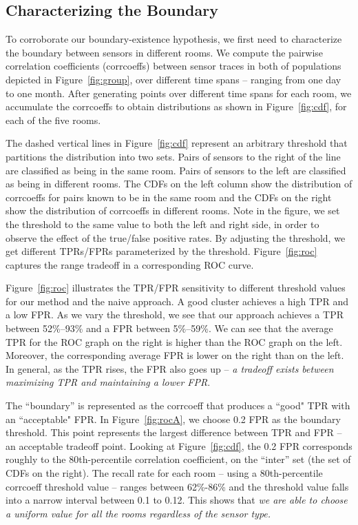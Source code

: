 \subsection{Characterizing the Boundary}
To corroborate our boundary-existence hypothesis, we first need to characterize the boundary between sensors in different rooms. 
We compute the pairwise correlation coefficients (corrcoeffs) between sensor traces in both of populations depicted in Figure~\ref{fig:group}, 
over different time spans -- ranging from one day to one month.
After generating points over different time 
spans for each room, we accumulate the corrcoeffs to obtain distributions as shown in Figure~\ref{fig:cdf}, for each of the five rooms. 

The dashed vertical lines in Figure~\ref{fig:cdf} 
represent an arbitrary threshold that partitions the distribution into two sets.  Pairs of sensors to the right of the line
are classified as being in the same room.  Pairs of sensors to the left are classified as being in different rooms.
The CDFs on the left column show the distribution of corrcoeffs for pairs known to be in the same room and the CDFs on the right
show the distribution of corrcoeffs in different rooms.
Note in the figure, we set the threshold to the same value to both the left and right side, in order to observe the effect of the true/false positive
rates.
By adjusting the threshold, we get different TPRs/FPRs parameterized by the threshold. Figure~\ref{fig:roc} captures the range tradeoff in a corresponding ROC curve.


Figure~\ref{fig:roc} illustrates the TPR/FPR sensitivity to different threshold values for our method and the naive approach. A good cluster achieves a high TPR and a low FPR. 
As we vary the threshold, we see that our approach 
achieves a TPR between 52\%--93\% and a FPR between 5\%--59\%.  %
We can see that the average TPR for the ROC graph on the right is higher than the 
ROC graph on the left.  Moreover, the corresponding average FPR is lower on the right than on the left.
In general, as the TPR rises, the FPR also goes up -- \emph{a tradeoff exists between maximizing TPR and maintaining a lower FPR}.


 The ``boundary'' is represented as the corrcoeff that produces a ``good" TPR with an ``acceptable" FPR.  In Figure~\ref{fig:rocA}, 
  we choose 0.2 FPR as the boundary threshold.  This point represents the largest difference between TPR and FPR -- an acceptable tradeoff point. 
Looking at Figure~\ref{fig:cdf}, the 0.2 FPR corresponds roughly to the 80th-percentile correlation coefficient, on the ``inter''
set (the set of CDFs on the right).
  The recall rate for each room -- using a 80th-percentile corrcoeff threshold value -- ranges between 62\%-86\% and the 
  threshold value falls into a narrow interval between 0.1 to 0.12. This shows that \emph{we are able to choose a uniform value 
  for all the rooms regardless of the sensor type.}

